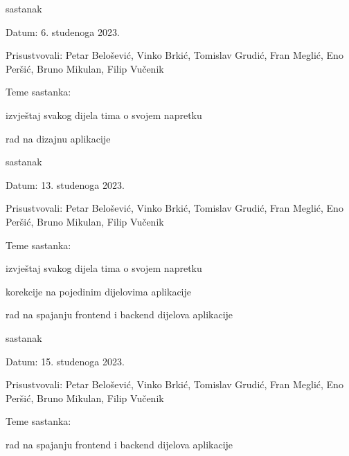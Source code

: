 \begin{packed_enum}
			\item  sastanak
			\item[] \begin{packed_item}
				\item Datum: 6. studenoga 2023.
				\item Prisustvovali: Petar Belošević, Vinko Brkić, Tomislav Grudić, Fran Meglić, Eno Peršić, Bruno Mikulan, Filip Vučenik
				\item Teme sastanka:
				\begin{packed_item}
					\item  izvještaj svakog dijela tima o svojem napretku
					\item rad na dizajnu aplikacije
				\end{packed_item}
			\end{packed_item}
			
			\item  sastanak
			\item[] \begin{packed_item}
				\item Datum: 13. studenoga 2023.
				\item Prisustvovali: Petar Belošević, Vinko Brkić, Tomislav Grudić, Fran Meglić, Eno Peršić, Bruno Mikulan, Filip Vučenik
				\item Teme sastanka:
				\begin{packed_item}
					\item  izvještaj svakog dijela tima o svojem napretku
					\item korekcije na pojedinim dijelovima aplikacije
					\item rad na spajanju frontend i backend dijelova aplikacije
				\end{packed_item}
			\end{packed_item}
			
			\item  sastanak
			\item[] \begin{packed_item}
				\item Datum: 15. studenoga 2023.
				\item Prisustvovali: Petar Belošević, Vinko Brkić, Tomislav Grudić, Fran Meglić, Eno Peršić, Bruno Mikulan, Filip Vučenik
				\item Teme sastanka:
				\begin{packed_item}
					\item rad na spajanju frontend i backend dijelova aplikacije
				\end{packed_item}
			\end{packed_item}
			

\end{packed_enum}
